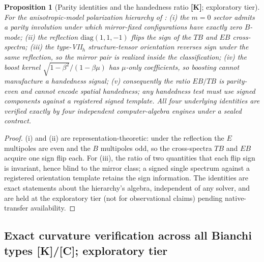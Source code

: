 \documentclass[10pt]{article}
\newtheorem{proposition}[theorem]{Proposition}
\theoremstyle{definition}
\newcommand{\tier}[1]{\textbf{[#1]}}
\begin{document}
\begin{proposition}[Parity identities and the handedness ratio
\tier{K}; exploratory tier]
\label{prop:parity}
For the anisotropic-model polarization hierarchy of
\cite{PontzenChallinor2007}: (i) the $m=0$ sector admits a parity
involution under which mirror-fixed configurations have exactly zero
$B$-mode; (ii) the reflection $\mathrm{diag}(1,1,-1)$ flips the sign
of the $TB$ and $EB$ cross-spectra; (iii) the type-VII$_h$
structure-tensor orientation reverses sign under the same reflection,
so the mirror pair is realized inside the classification; (iv) the
boost kernel $\sqrt{1-\beta^2}/(1-\beta\mu)$ has $\mu$-only
coefficients, so boosting cannot manufacture a handedness signal;
(v) consequently the ratio
$EB/TB$ is parity-\emph{even} and cannot encode spatial handedness;
any handedness test must use signed components against a registered
signed template. All four underlying identities are verified exactly
by four independent computer-algebra engines under a sealed contract.
\end{proposition}
\begin{proof}
(i) and (ii) are representation-theoretic: under the reflection the
$E$ multipoles are even and the $B$ multipoles odd, so the cross-spectra
$TB$ and $EB$ acquire one sign flip each. For (iii), the ratio of two
quantities that each flip sign is invariant, hence blind to the
mirror class; a signed single spectrum against a registered
orientation template retains the sign information. The identities are
exact statements about the hierarchy's algebra, independent of any
solver, and are held at the exploratory tier (not for observational
claims) pending native-transfer availability.
\end{proof}

\subsection{Exact curvature verification across all Bianchi types
\tier{K}/\tier{C}; exploratory tier}
\end{document}
